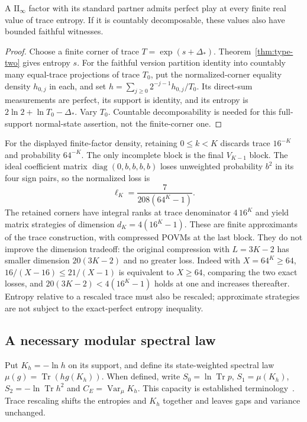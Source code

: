 \begin{corollary}\label{cor:infinite-type-two}
A $\mathrm{II}_\infty$ factor with its standard partner admits perfect play at every finite real value of trace entropy. If it is countably decomposable, these values also have bounded faithful witnesses.
\end{corollary}
\begin{proof}
Choose a finite corner of trace $T=\exp(s+\Delta_*)$. Theorem~\ref{thm:type-two} gives entropy $s$. For the faithful version partition identity into countably many equal-trace projections of trace $T_0$, put the normalized-corner equality density $h_{0,j}$ in each, and set $h=\sum_{j\ge0}2^{-j-1}h_{0,j}/T_0$. Its direct-sum measurements are perfect, its support is identity, and its entropy is $2\ln2+\ln T_0-\Delta_*$. Vary $T_0$. Countable decomposability is needed for this full-support normal-state assertion, not the finite-corner one.
\end{proof}

For the displayed finite-factor density, retaining $0\le k<K$ discards trace $16^{-K}$ and probability $64^{-K}$. The only incomplete block is the final $V_{K-1}$ block. The ideal coefficient matrix $\operatorname{diag}(0,b,b,b,b)$ loses unweighted probability $b^2$ in its four sign pairs, so the normalized loss is
\[
 \ell_K=\frac{7}{208(64^K-1)}.
\]
The retained corners have integral ranks at trace denominator $4\,16^K$ and yield matrix strategies of dimension $d_K=4(16^K-1)$. These are finite approximants of the trace construction, with compressed POVMs at the last block. They do not improve the dimension tradeoff: the original compression with $L=3K-2$ has smaller dimension $20(3K-2)$ and no greater loss. Indeed with $X=64^K\ge64$, $16/(X-16)\le21/(X-1)$ is equivalent to $X\ge64$, comparing the two exact losses, and $20(3K-2)<4(16^K-1)$ holds at one and increases thereafter. Entropy relative to a rescaled trace must also be rescaled; approximate strategies are not subject to the exact-perfect entropy inequality.

\subsection{A necessary modular spectral law}
Put $K_h=-\ln h$ on its support, and define its state-weighted spectral law $\mu(g)=\operatorname{Tr}(h g(K_h))$. When defined, write $S_0=\ln\operatorname{Tr}p$, $S_1=\mu(K_h)$, $S_2=-\ln\operatorname{Tr}h^2$ and $C_E=\operatorname{Var}_\mu K_h$. This capacity is established terminology~\cite[Sections 2--3]{Capacity}. Trace rescaling shifts the entropies and $K_h$ together and leaves gaps and variance unchanged.

